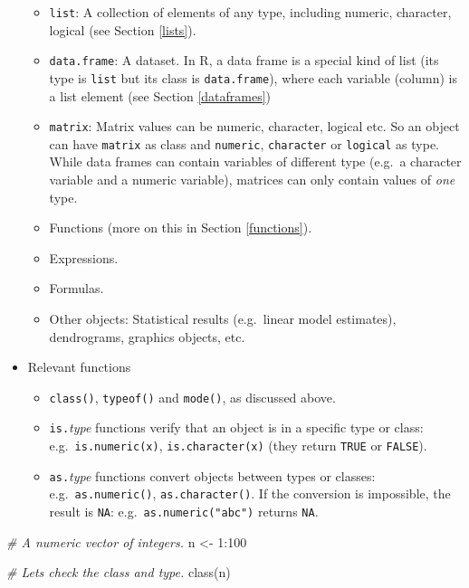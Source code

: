 \documentclass[
]{book}
\newenvironment{Shaded}{\begin{snugshade}}{\end{snugshade}}
\newcommand{\CommentTok}[1]{\textcolor[rgb]{0.56,0.35,0.01}{\textit{#1}}}
\newcommand{\DecValTok}[1]{\textcolor[rgb]{0.00,0.00,0.81}{#1}}
\newcommand{\FunctionTok}[1]{\textcolor[rgb]{0.00,0.00,0.00}{#1}}
\newcommand{\NormalTok}[1]{#1}
\newcommand{\OtherTok}[1]{\textcolor[rgb]{0.56,0.35,0.01}{#1}}
\newcommand{\SpecialCharTok}[1]{\textcolor[rgb]{0.00,0.00,0.00}{#1}}
\providecommand{\tightlist}{%
  \setlength{\itemsep}{0pt}\setlength{\parskip}{0pt}}
\begin{document}
\begin{itemize}
  \begin{itemize}
  \tightlist
  \item
    \texttt{list}: A collection of elements of any type, including numeric, character, logical (see Section \ref{lists}).
  \item
    \texttt{data.frame}: A dataset. In R, a data frame is a special kind of list (its type is \texttt{list} but its class is \texttt{data.frame}), where each variable (column) is a list element (see Section \ref{dataframes})
  \item
    \texttt{matrix}: Matrix values can be numeric, character, logical etc. So an object can have \texttt{matrix} as class and \texttt{numeric}, \texttt{character} or \texttt{logical} as type. While data frames can contain variables of different type (e.g.~a character variable and a numeric variable), matrices can only contain values of \emph{one} type.
  \item
    Functions (more on this in Section \ref{functions}).
  \item
    Expressions.
  \item
    Formulas.
  \item
    Other objects: Statistical results (e.g.~linear model estimates), dendrograms, graphics objects, etc.
  \end{itemize}
\item
  Relevant functions

  \begin{itemize}
  \tightlist
  \item
    \texttt{class()}, \texttt{typeof()} and \texttt{mode()}, as discussed above.
  \item
    \texttt{is.}\emph{type} functions verify that an object is in a specific type or class: e.g.~\texttt{is.numeric(x)}, \texttt{is.character(x)} (they return \texttt{TRUE} or \texttt{FALSE}).
  \item
    \texttt{as.}\emph{type} functions convert objects between types or classes: e.g.~\texttt{as.numeric()}, \texttt{as.character()}. If the conversion is impossible, the result is \texttt{NA}: e.g.~\texttt{as.numeric("abc")} returns \texttt{NA}.
  \end{itemize}
\end{itemize}

\begin{Shaded}
\begin{Highlighting}[]
\CommentTok{\# A numeric vector of integers.}
\NormalTok{n }\OtherTok{\textless{}{-}} \DecValTok{1}\SpecialCharTok{:}\DecValTok{100}

\CommentTok{\# Let\textquotesingle{}s check the class and type.}
\FunctionTok{class}\NormalTok{(n)}
\end{Highlighting}
\end{Shaded}
\end{document}
